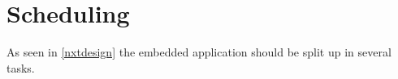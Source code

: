 \section{Scheduling}

As seen in \autoref{nxtdesign} the embedded application should be split up in several tasks.


